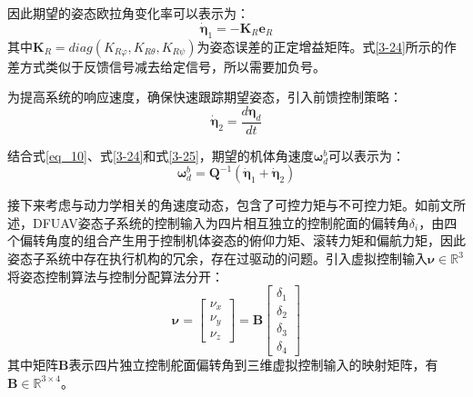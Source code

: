 因此期望的姿态欧拉角变化率可以表示为：
\begin{equation}
    \dot{\boldsymbol{\eta}}_1=-\boldsymbol{K}_R\boldsymbol{e}_R
    \label{3-24}
\end{equation}
其中$\boldsymbol{K}_R=diag({K}_{R\varphi},{K}_{R\theta},{K}_{R\psi})$为姿态误差的正定增益矩阵。式\eqref{3-24}所示的作差方式类似于反馈信号减去给定信号，所以需要加负号。

为提高系统的响应速度，确保快速跟踪期望姿态，引入前馈控制策略：
\begin{equation}
    \dot{\boldsymbol{\eta}}_2=\frac{d\boldsymbol{\eta}_d}{dt}
    \label{3-25}
\end{equation}

结合式\eqref{eq_10}、式\eqref{3-24}和式\eqref{3-25}，期望的机体角速度$\boldsymbol\omega^{b}_d$可以表示为：
\begin{equation}
    \boldsymbol{\omega}^{b}_d=\boldsymbol{Q}^{-1}( \dot{\boldsymbol{\eta}}_1+ \dot{\boldsymbol{\eta}}_2)
    \label{3-26}
\end{equation}

接下来考虑与动力学相关的角速度动态，包含了可控力矩与不可控力矩。如前文所述，DFUAV姿态子系统的控制输入为四片相互独立的控制舵面的偏转角$\delta_i$，由四个偏转角度的组合产生用于控制机体姿态的俯仰力矩、滚转力矩和偏航力矩，因此姿态子系统中存在执行机构的冗余，存在过驱动的问题。引入虚拟控制输入$\boldsymbol{\nu}\in\mathbb{R}^3$将姿态控制算法与控制分配算法分开：
\begin{equation}
    \boldsymbol{\nu}=
    \begin{bmatrix}
    {\nu}_x \\ {\nu}_y \\ {\nu}_z
    \end{bmatrix}=\boldsymbol{B}
    \begin{bmatrix}
    \delta_1 \\ \delta_2 \\ \delta_3 \\ \delta_4
    \end{bmatrix}
    \label{3-27}
\end{equation}
其中矩阵$\boldsymbol{B}$表示四片独立控制舵面偏转角到三维虚拟控制输入的映射矩阵，有$\boldsymbol{B}\in\mathbb{R}^{3\times4}$。

